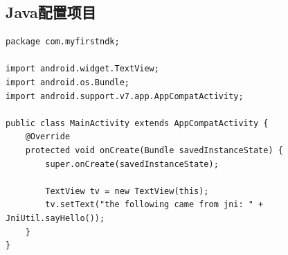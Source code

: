 \documentclass[9pt, b5paper]{article}
\begin{document}
\subsection{Java配置项目}
\label{sec-2-10}
\begin{verbatim}
package com.myfirstndk;

import android.widget.TextView;
import android.os.Bundle;
import android.support.v7.app.AppCompatActivity;

public class MainActivity extends AppCompatActivity {
    @Override
    protected void onCreate(Bundle savedInstanceState) {
        super.onCreate(savedInstanceState);

        TextView tv = new TextView(this);
        tv.setText("the following came from jni: " + JniUtil.sayHello());
    }
}
\end{verbatim}
\end{document}
